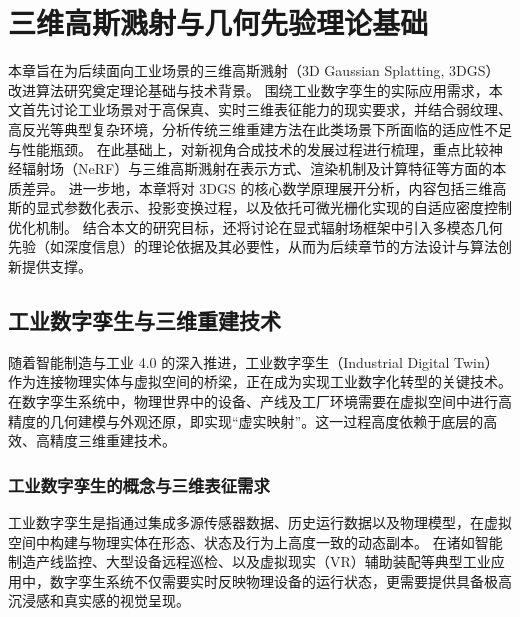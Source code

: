 \chapter{三维高斯溅射与几何先验理论基础}
\label{chap:theory_foundation}

本章旨在为后续面向工业场景的三维高斯溅射（3D Gaussian Splatting, 3DGS）改进算法研究奠定理论基础与技术背景。
围绕工业数字孪生的实际应用需求，本文首先讨论工业场景对于高保真、实时三维表征能力的现实要求，并结合弱纹理、高反光等典型复杂环境，分析传统三维重建方法在此类场景下所面临的适应性不足与性能瓶颈。
在此基础上，对新视角合成技术的发展过程进行梳理，重点比较神经辐射场（NeRF）与三维高斯溅射在表示方式、渲染机制及计算特征等方面的本质差异。
进一步地，本章将对 3DGS 的核心数学原理展开分析，内容包括三维高斯的显式参数化表示、投影变换过程，以及依托可微光栅化实现的自适应密度控制优化机制。
结合本文的研究目标，还将讨论在显式辐射场框架中引入多模态几何先验（如深度信息）的理论依据及其必要性，从而为后续章节的方法设计与算法创新提供支撑。

\section{工业数字孪生与三维重建技术}
\label{sec:digital_twin_reconstruction}

随着智能制造与工业 4.0 的深入推进，工业数字孪生（Industrial Digital Twin）作为连接物理实体与虚拟空间的桥梁，正在成为实现工业数字化转型的关键技术。
在数字孪生系统中，物理世界中的设备、产线及工厂环境需要在虚拟空间中进行高精度的几何建模与外观还原，即实现“虚实映射”。这一过程高度依赖于底层的高效、高精度三维重建技术。

\subsection{工业数字孪生的概念与三维表征需求}
\label{subsec:dt_concept_needs}

工业数字孪生是指通过集成多源传感器数据、历史运行数据以及物理模型，在虚拟空间中构建与物理实体在形态、状态及行为上高度一致的动态副本。
在诸如智能制造产线监控、大型设备远程巡检、以及虚拟现实（VR）辅助装配等典型工业应用中，数字孪生系统不仅需要实时反映物理设备的运行状态，更需要提供具备极高沉浸感和真实感的视觉呈现。

